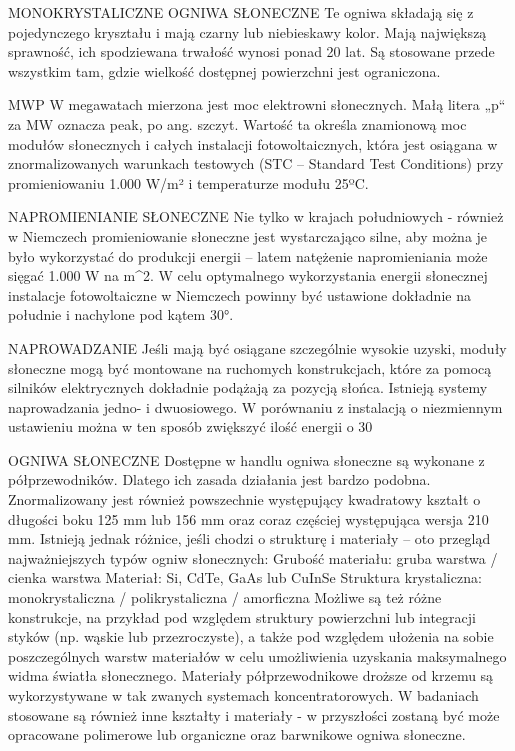 \documentclass[12pt,a4paper]{article}
\begin{document}
MONOKRYSTALICZNE OGNIWA SŁONECZNE
Te ogniwa składają się z pojedynczego kryształu i mają czarny lub niebieskawy kolor. Mają największą sprawność, ich spodziewana trwałość wynosi ponad 20 lat. Są stosowane przede wszystkim tam, gdzie wielkość dostępnej powierzchni jest ograniczona.


MWP
W megawatach mierzona jest moc elektrowni słonecznych. Małą litera „p“ za MW oznacza peak, po ang. szczyt. Wartość ta określa znamionową moc modułów słonecznych i całych instalacji fotowoltaicznych, która jest osiągana w znormalizowanych warunkach testowych (STC – Standard Test Conditions) przy promieniowaniu 1.000 W/m² i temperaturze modułu 25ºC.


NAPROMIENIANIE SŁONECZNE
Nie tylko w krajach południowych - również w Niemczech promieniowanie słoneczne jest wystarczająco silne, aby można je było wykorzystać do produkcji energii – latem natężenie napromieniania może sięgać 1.000 W na m^{2}. W celu optymalnego wykorzystania energii słonecznej instalacje fotowoltaiczne w Niemczech powinny być ustawione dokładnie na południe i nachylone pod kątem 30°.


NAPROWADZANIE 
Jeśli mają być osiągane szczególnie wysokie uzyski, moduły słoneczne mogą być montowane na ruchomych konstrukcjach, które za pomocą silników elektrycznych dokładnie podążają za pozycją słońca. Istnieją systemy naprowadzania jedno- i dwuosiowego. W porównaniu z instalacją o niezmiennym ustawieniu można w ten sposób zwiększyć ilość energii o 30%


OGNIWA SŁONECZNE 
Dostępne w handlu ogniwa słoneczne są wykonane z półprzewodników. Dlatego ich zasada działania jest bardzo podobna. Znormalizowany jest również powszechnie występujący kwadratowy kształt o długości boku 125 mm lub 156 mm oraz coraz częściej występująca wersja 210 mm. Istnieją jednak różnice, jeśli chodzi o strukturę i materiały – oto przegląd najważniejszych typów ogniw słonecznych:
Grubość materiału:	gruba warstwa / cienka warstwa
Materiał:	Si, CdTe, GaAs lub CuInSe
Struktura krystaliczna:	monokrystaliczna / polikrystaliczna / amorficzna
Możliwe są też różne konstrukcje, na przykład pod względem struktury powierzchni lub integracji styków (np. wąskie lub przezroczyste), a także pod względem ułożenia na sobie poszczególnych warstw materiałów w celu umożliwienia uzyskania maksymalnego widma światła słonecznego.
Materiały półprzewodnikowe droższe od krzemu są wykorzystywane w tak zwanych systemach koncentratorowych. W badaniach stosowane są również inne kształty i materiały - w przyszłości zostaną być może opracowane polimerowe lub organiczne oraz barwnikowe ogniwa słoneczne.
\end{document}
